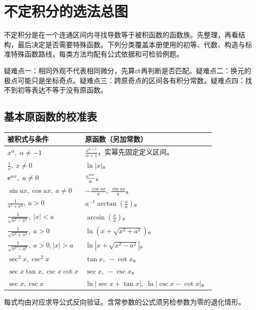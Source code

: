\section{不定积分的选法总图}\label{ic:atlas}
不定积分是在一个连通区间内寻找导数等于被积函数的函数族。先整理，再看结构，最后决定是否需要特殊函数。下列分类覆盖本册使用的初等、代数、构造与标准特殊函数路线，每类方法均配有公式依据和可检验例题。
\begin{center}\end{center}
\begin{warning}疑难点一：相同外观不代表相同微分，先算$\dd t$再判断是否匹配。疑难点二：换元的极点可能只是坐标奇点。疑难点三：跨原奇点的区间各有积分常数。疑难点四：找不到初等表达不等于没有原函数。\end{warning}
\subsection{基本原函数的校准表}
\begin{longtable}{p{49mm}p{67mm}}\toprule 被积式与条件&原函数（另加常数）\\\midrule\endhead
$x^\alpha,\ \alpha\ne-1$&$\frac{x^{\alpha+1}}{\alpha+1}$，实幂先固定定义区间。\\
$\frac{1}{x},\ x\ne0$&$\ln|x|$。\\
$\e^{ax},\ a\ne0$&$\frac{\mathrm{e}^{ax}}{a}$。\\
$\sin ax,\cos ax,\ a\ne0$&$-\frac{\cos ax}{a},\ \frac{\sin ax}{a}$。\\
$\frac{1}{a^2+x^2},\ a>0$&$a^{-1}\arctan(\frac{x}{a})$。\\
$\frac{1}{\sqrt{a^2-x^2}},\ |x|<a$&$\arcsin(\frac{x}{a})$。\\
$\frac{1}{\sqrt{x^2+a^2}},\ a>0$&$\ln(x+\sqrt{x^2+a^2})$。\\
$\frac{1}{\sqrt{x^2-a^2}},\ a>0,|x|>a$&$\ln|x+\sqrt{x^2-a^2}|$。\\
$\sec^2x,\csc^2x$&$\tan x,\ -\cot x$。\\
$\sec x\tan x,\csc x\cot x$&$\sec x,\ -\csc x$。\\
$\sec x,\csc x$&$\ln|\sec x+\tan x|,\ \ln|\csc x-\cot x|$。\\
\bottomrule\end{longtable}
每式均由对应求导公式反向验证。含常参数的公式须另检参数为零的退化情形。
